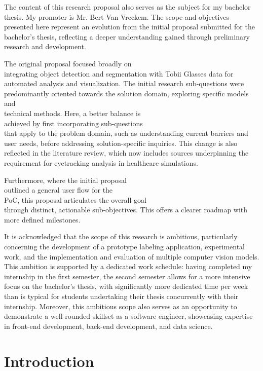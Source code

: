\documentclass[english]{hogent-article}
\begin{document}
The content of this research proposal also serves as the subject for my bachelor thesis. 
My promoter is Mr. Bert Van Vreckem. The scope and objectives presented here represent an evolution from the initial proposal submitted 
for the bachelor's thesis, reflecting a deeper understanding gained through preliminary research and development.

The original proposal focused broadly on\\ integrating object detection and segmentation with Tobii Glasses data for automated analysis and visualization.
The initial research sub-questions were\\ predominantly oriented towards the solution domain, exploring specific models and\\ technical methods.
Here, a better balance is\\ achieved by first incorporating sub-questions\\ that apply to the problem domain, 
such as understanding current barriers and user needs, before addressing solution-specific inquiries.
This change is also reflected in the literature review, which now includes sources underpinning the requirement for eyetracking analysis in healthcare simulations.

Furthermore, where the initial proposal\\ outlined a general user flow for the\\ PoC,
this proposal articulates the overall goal\\ through distinct, actionable sub-objectives.
This offers a clearer roadmap with more defined milestones.

It is acknowledged that the scope of this research is ambitious, particularly concerning the development of a 
prototype labeling application, experimental work, and the implementation and evaluation of multiple computer vision models.
This ambition is supported by a dedicated work schedule: having completed my internship in the first semester, the second semester allows for a more intensive focus
on the bachelor's thesis, with significantly more dedicated time per week than is typical for students undertaking their thesis concurrently with their internship.
Moreover, this ambitious scope also serves as an opportunity to demonstrate a well-rounded skillset as a software engineer, showcasing expertise in front-end development, back-end development, and data science.

\section{Introduction}
\label{sec:Introduction}
\end{document}
